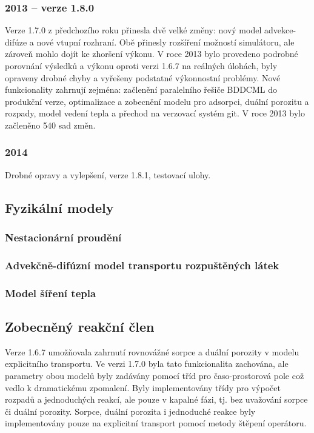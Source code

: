 \documentclass[11pt]{report}
\begin{document}
\subsubsection{2013 -- verze 1.8.0}
Verze 1.7.0 z předchozího roku přinesla dvě velké změny: nový model 
advekce-difúze a nové vtupní rozhraní. Obě přinesly rozšíření možností 
simulátoru, ale zároveň mohlo dojít ke zhoršení výkonu. V roce 2013 bylo 
provedeno podrobné porovnání výsledků a výkonu oproti verzi 1.6.7 na reálných 
úlohách, byly opraveny drobné chyby a vyřešeny podstatné výkonnostní problémy.  
Nové funkcionality zahrnují zejména: začlenění paralelního řešiče BDDCML do 
produkční verze, optimalizace a zobecnění modelu pro adsorpci, duální porozitu a 
rozpady, model vedení tepla a přechod na verzovací systém git. V roce 2013 bylo 
začleněno 540 sad změn.
\subsubsection{2014}
Drobné opravy a vylepšení, verze 1.8.1, testovací ulohy.

\subsection{Fyzikální modely}
\subsubsection{Nestacionární proudění}

\subsubsection{Advekčně-difúzní model transportu rozpuštěných látek}
\label{sc:transport_model}


\subsubsection{Model šíření tepla}
\label{sc:heat}


\subsection{Zobecněný reakční člen}
Verze 1.6.7 umožňovala zahrnutí rovnovážné sorpce a duální porozity v modelu 
explicitního transportu. Ve verzi 1.7.0 byla tato funkcionalita zachována, ale 
parametry obou modelů byly zadávány pomocí tříd pro časo-prostorová pole což 
vedlo k dramatickému zpomalení. Byly implementovány třídy pro výpočet rozpadů a 
jednoduchých reakcí, ale pouze v kapalné fázi, tj. bez uvažování sorpce či 
duální porozity. Sorpce, duální porozita i jednoduché reakce byly implementovány 
pouze na explicitní transport pomocí metody štěpení operátoru. 
\end{document}
